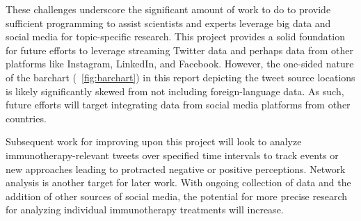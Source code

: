 These challenges underscore the significant amount
of work to do to provide sufficient programming
to assist scientists and experts leverage big data
and social media for topic-specific research. 
This project provides a solid foundation for
future efforts to leverage streaming Twitter data
and perhaps data from other platforms like
Instagram, LinkedIn, and Facebook.  However, the one-sided 
nature of the barchart (~\ref{fig:barchart}) in this report 
depicting the tweet source locations is likely significantly
skewed from not including foreign-language data.  As such, 
future efforts will target integrating data from social media
platforms from other countries.  

Subsequent work for improving upon this project will look to
analyze immunotherapy-relevant tweets over specified time 
intervals to track events or new approaches leading to protracted 
negative or positive perceptions.  Network analysis is another 
target for later work.  With ongoing collection of data and the 
addition of other sources of social media, the potential for 
more precise research for analyzing individual immunotherapy 
treatments will increase.

\medskip


 

